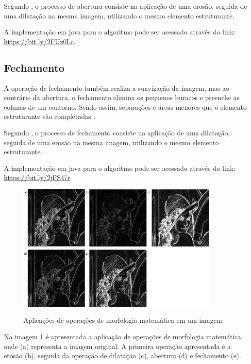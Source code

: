 \documentclass[
	12pt,				%
	oneside,			%
	a4paper,			%
	english,			%
	french,				%
	spanish,			%
	brazil,				%
	]{abntex2}
\begin{document}
Segundo \citet{pedriniSchwartz:2008}, o processo de abertura consiste na aplicação de uma erosão, seguida de uma dilatação na mesma imagem, utilizando o mesmo elemento estruturante.

A implementação em java para o algoritmo pode ser acessado através do link: \url{https://bit.ly/2FUz0Lc}.

\subsection{Fechamento}

A operação de fechamento também realiza a suavização da imagem, mas ao contrário da abertura, o fechamento elimina os pequenos buracos e preenche as colunas de um contorno. Sendo assim, separações e áreas menores que o elemento estruturante são completadas \cite{gonzalesWoods:2008}.

Segundo \citet{pedriniSchwartz:2008}, o processo de fechamento consiste na aplicação de uma dilatação, seguida de uma erosão na mesma imagem, utilizando o mesmo elemento estruturante.

A implementação em java para o algoritmo pode ser acessado através do link: \url{https://bit.ly/2jFS47r}.

\begin{figure}[ht]
\centering
\caption{Aplicações de operações de morfologia matemática em um imagem}
\includegraphics[width=0.9\textwidth]{imagens/morfologia.png}
\sourceAuthor
\label{fig:morfologia}
\end{figure}

Na imagem \ref{fig:morfologia} é apresentada a aplicação de operações de morfologia matemática, onde (a) representa a imagem original. A primeira operação apresentada é a erosão (b), seguida da operação de dilatação (c), abertura (d) e fechamento (e).
    
\end{document}

